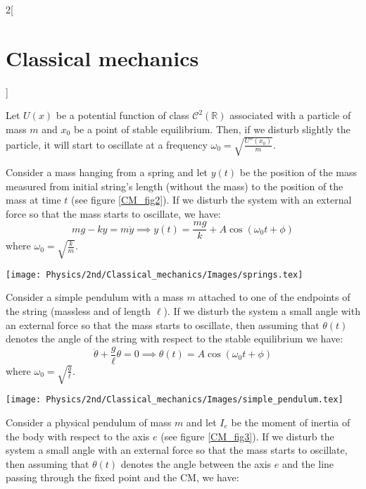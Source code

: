 \documentclass[../../../main.tex]{subfiles}
\begin{document}
\begin{multicols}{2}[\section{Classical mechanics}]
\begin{definition}
  \end{definition}
  \begin{prop}
    Let $U(x)$ be a potential function of class $\mathcal{C}^2(\mathbb{R})$ associated with a particle of mass $m$ and $x_0$ be a point of stable equilibrium. Then, if we disturb slightly the particle, it will start to oscillate at a frequency $\omega_0=\sqrt{\frac{U''(x_0)}{m}}$.
  \end{prop}
  \begin{prop}
    Consider a mass hanging from a spring and let $y(t)$ be the position of the mass measured from initial string's length (without the mass) to the position of the mass at time $t$ (see figure \ref{CM_fig2}). If we disturb the system with an external force so that the mass starts to oscillate, we have: $$mg-ky=m\ddot{y}\implies y(t)=\frac{mg}{k}+A\cos(\omega_0t+\phi)$$ where $\omega_0=\sqrt{\frac{k}{m}}$.
    \begin{center}
      \begin{minipage}{\linewidth}
        \centering
        \texttt{[image: Physics/2nd/Classical\_mechanics/Images/springs.tex]}
        \label{CM_fig2}
      \end{minipage}
    \end{center}
  \end{prop}
  \begin{prop}
    Consider a simple pendulum with a mass $m$ attached to one of the endpoints of the string (massless and of length $\ell$). If we disturb the system a small angle with an external force so that the mass starts to oscillate, then assuming that $\theta(t)$ denotes the angle of the string with respect to the stable equilibrium we have:
    $$\ddot{\theta}+\frac{g}{\ell}\theta=0\implies\theta(t)=A\cos(\omega_0t+\phi)$$ where $\omega_0=\sqrt{\frac{g}{\ell}}$.
    \begin{center}
      \begin{minipage}{\linewidth}
        \centering
        \texttt{[image: Physics/2nd/Classical\_mechanics/Images/simple\_pendulum.tex]}
      \end{minipage}
    \end{center}
  \end{prop}
  \begin{prop}
    Consider a physical pendulum of mass $m$ and let $I_e$ be the moment of inertia of the body with respect to the axis $e$ (see figure \ref{CM_fig3}). If we disturb the system a small angle with an external force so that the mass starts to oscillate, then assuming that $\theta(t)$ denotes the angle between the axis $e$ and the line passing through the fixed point and the CM, we have:

\end{prop}
\end{multicols}
\end{document}
